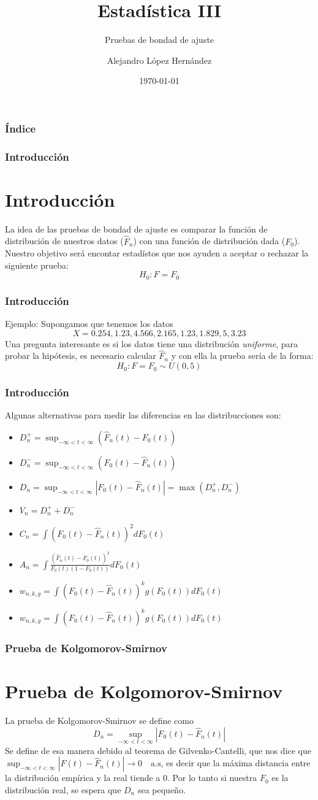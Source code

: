 \documentclass[aspectratio=169,spanish]{beamer}
\title{Estadística III}
\subtitle{Pruebas de bondad de ajuste}
\author{Alejandro López Hernández}
\institute{FES Acatlán - UNAM}
\date{\today}
\begin{document}
\frame{\titlepage}



\begin{frame}
\frametitle{Índice}
\tableofcontents
\end{frame}



\begin{frame}
\frametitle{Introducción}
\section{Introducción}
La idea de las pruebas de bondad de ajuste es comparar la función de distribución de nuestros datos ($\hat{F}_n$) con una función de distribución dada ($F_0$). Nuestro objetivo será encontar estadístos que nos ayuden a aceptar o rechazar la siguiente prueba: $$H_0: F=F_0$$
\end{frame}

\begin{frame}
\frametitle{Introducción}
Ejemplo: Supongamos que tenemos los datos $$X =0.254, 1.23,4.566,2.165,1.23,1.829,5,3.23$$
Una pregunta interesante es si los datos tiene una distribución \textit{uniforme}, para probar la hipótesis, es necesario calcular $\hat{F}_n$ y con ella la prueba sería de la forma:
$$H_0: F=F_0\sim U(0,5)$$
\end{frame}
\begin{frame}
\frametitle{Introducción}
Algunas alternativas para medir las diferencias en las distribucciones son:
\begin{itemize}
\item $D_n^{+}=\sup_{-\infty<t<\infty}(\hat{F}_n(t)-F_0(t))$
\item $D_n^{-}=\sup_{-\infty<t<\infty}(F_0(t)-\hat{F}_n(t))$
\item $D_n=\sup_{-\infty<t<\infty}|F_0(t)-\hat{F}_n(t)|=\max(D_n^{+},D_n^{-})$
\item $V_n =D_n^{+}+D_n^{-}$
\item $C_n=\int(F_0(t)-\hat{F}_n(t))^2dF_0(t)$
\item $A_n=\int\frac{(\hat{F}_n(t)-F_0(t))^2}{F_0(t)(1-F_0(t))}dF_0(t)$
\item $w_{n,k,g}=\int(F_0(t)-\hat{F}_n(t))^k g(F_0(t))dF_0(t)$
\item $w_{n,k,g}=\int(F_0(t)-\hat{F}_n(t))^k g(F_0(t))dF_0(t)$
\end{itemize}
\end{frame}

\begin{frame}
\frametitle{Prueba de Kolgomorov-Smirnov}
\section{Prueba de Kolgomorov-Smirnov}
La prueba de Kolgomorov-Smirnov se define como $$D_n=\sup_{-\infty<t<\infty}|F_0(t)-\hat{F}_n(t)|$$ 
Se define de esa manera debido al teorema de Gilvenko-Cantelli, que nos dice que $\sup_{-\infty<t<\infty}|F(t)-\hat{F}_n(t)|\rightarrow 0\quad \text{a.s}$, es decir que la máxima distancia entre la distribución empírica y la real tiende a 0. Por lo tanto si nuestra $F_0$ es la distribución real, se espera que $D_n$ sea pequeño.
\end{frame}
\end{document}
